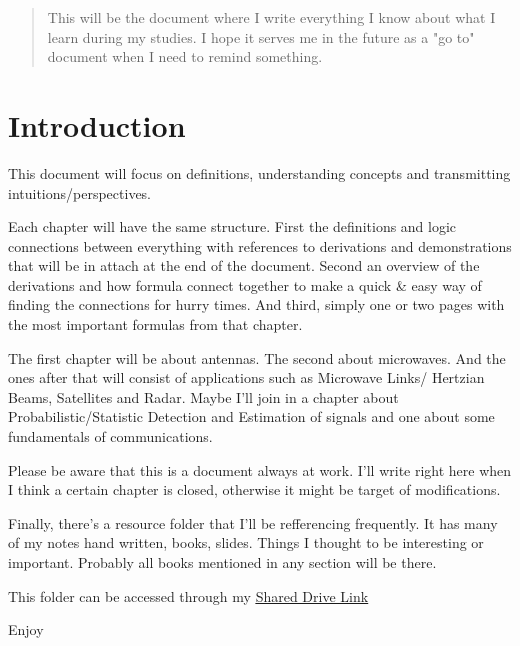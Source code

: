 

\begin{abstract}
    This will be the document where I write everything I know about what I learn during my studies.
    I hope it serves me in the future as a "go to" document when I need to remind something.
\end{abstract}

\section*{\hfil Introduction \hfil}\label{sec:intro}
\par This document will focus on definitions, understanding concepts and transmitting intuitions/perspectives. 
\par Each chapter will have the same structure. First the definitions and logic connections between everything with references to derivations and demonstrations that will be in attach at the end of the document. Second an overview of the derivations and how formula connect together to make a quick \& easy way of finding the connections for hurry times.
And third, simply one or two pages with the most important formulas from that chapter.
\par The first chapter will be about antennas. The second about microwaves. And the ones after that will consist of applications such as Microwave Links/ Hertzian Beams, Satellites and Radar. Maybe I'll join in a chapter about Probabilistic/Statistic Detection and Estimation of signals and one about some fundamentals of communications.
\par Please be aware that this is a document always at work. I'll write right here when I think a certain chapter is closed, otherwise it might be target of modifications.

\par Finally, there's a resource folder that I'll be refferencing frequently. It has many of my notes hand written, books, slides. Things I thought to be interesting or important. Probably all books mentioned in any section will be there. 
\begin{center}
    \par This folder can be accessed through my \href{https://drive.google.com/drive/folders/1lhU0XlDLMHOkMt60VkjH9rhP8QEZuinX?usp=sharing}{\ul{Shared Drive Link}}    
\end{center}


\vspace{1cm}
\begin{center}
    Enjoy
\end{center}





